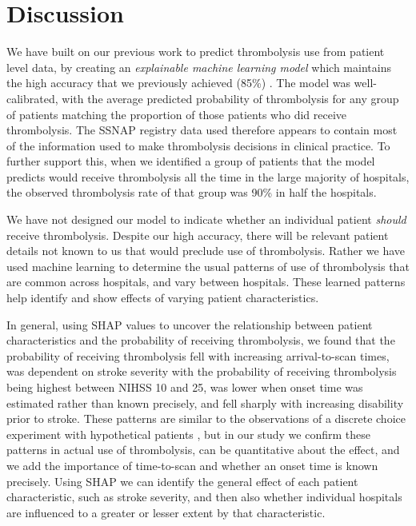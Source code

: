 \section{Discussion}

We have built on our previous work to predict thrombolysis use from patient level data, by creating an \emph{explainable machine learning model} which maintains the high accuracy that we previously achieved (85\%) \cite{allen_use_2022}. The model was well-calibrated, with the average predicted probability of thrombolysis for any group of patients matching the proportion of those patients who did receive thrombolysis. The SSNAP registry data used therefore appears to contain most of the information used to make thrombolysis decisions in clinical practice. To further support this, when we identified a group of patients that the model predicts would receive thrombolysis all the time in the large majority of hospitals, the observed thrombolysis rate of that group was 90\% in half the hospitals.

We have not designed our model to indicate whether an individual patient \emph{should} receive thrombolysis. Despite our high accuracy, there will be relevant patient details not known to us that would preclude use of thrombolysis. Rather we have used machine learning to determine the usual patterns of use of thrombolysis that are common across hospitals, and vary between hospitals. These learned patterns help identify and show effects of varying patient characteristics.

In general, using SHAP values to uncover the relationship between patient characteristics and the probability of receiving thrombolysis, we found that the probability of receiving thrombolysis fell with increasing arrival-to-scan times, was dependent on stroke severity with the probability of receiving thrombolysis being highest between NIHSS 10 and 25, was lower when onset time was estimated rather than known precisely, and fell sharply with increasing disability prior to stroke. These patterns are similar to the observations of a discrete choice experiment with hypothetical patients \cite{de_brun_factors_2018}, but in our study we confirm these patterns in actual use of thrombolysis, can be quantitative about the effect, and we add the importance of time-to-scan and whether an onset time is known precisely. Using SHAP we can identify the general effect of each patient characteristic, such as stroke severity, and then also whether individual hospitals are influenced to a greater or lesser extent by that characteristic.

